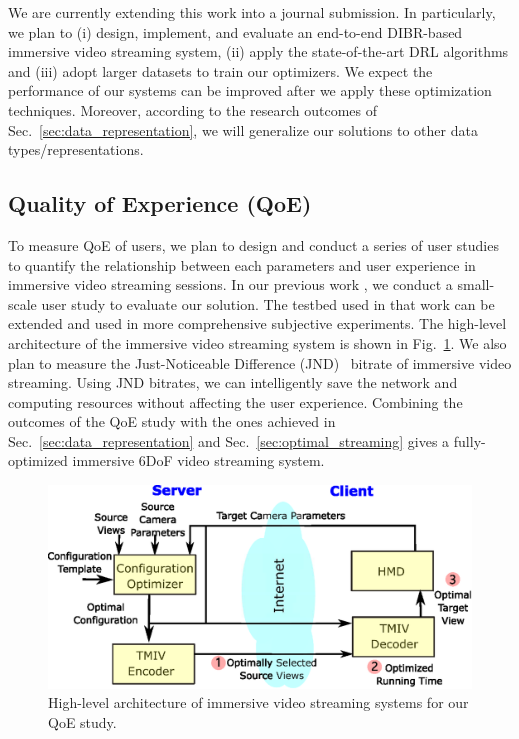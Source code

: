 We are currently extending this work into a journal submission. 
In particularly, we plan to (i) design, implement, and evaluate an end-to-end DIBR-based immersive video streaming system,
(ii) apply the state-of-the-art DRL algorithms and (iii) adopt larger datasets to train our optimizers.
We expect the performance of our systems can be improved after we apply these optimization techniques.
Moreover, according to the research outcomes of Sec.~\ref{sec:data_representation}, 
we will generalize our solutions to other data types/representations.
\subsection{Quality of Experience (QoE)}
To measure QoE of users, we plan to design and conduct a series of user studies  
to quantify the relationship between each parameters and user experience in immersive video streaming sessions.
In our previous work \cite{mm20_tr}, we conduct a small-scale user study to evaluate our solution.
The testbed used in that work can be extended and used in more comprehensive subjective experiments.
The high-level architecture of the immersive video streaming system is shown in Fig.~\ref{fig:architecture}.
We also plan to measure the Just-Noticeable Difference (JND)~\cite{JLK06} bitrate of immersive video streaming.
Using JND bitrates, we can intelligently save the network and computing resources without affecting the user experience.
Combining the outcomes of the QoE study with the ones achieved in Sec.~\ref{sec:data_representation} and Sec.~\ref{sec:optimal_streaming}
gives a fully-optimized immersive 6DoF video streaming system.
\begin{figure}[tbh]
	\begin{center}
		\includegraphics[width=.5\textwidth]{fig/architecture}
		\caption{High-level architecture of immersive video streaming systems for our QoE study.}
		\label{fig:architecture}
	\end{center}
\end{figure}

